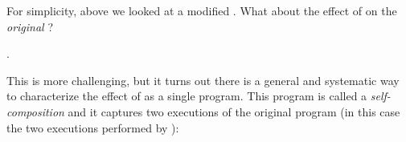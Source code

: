 \documentclass[12pt]{report}
\begin{document}
For simplicity, above we looked at a modified .
    What about the effect of  on the \textit{original} ? 
\begin{coqdoccode}
\coqdocnoindent
{} .\coqdoceol
\coqdocemptyline
\end{coqdoccode}
This is more challenging, but it turns out there is a general and
    systematic way to characterize the effect of  as a single
    program. This program is called a \textit{self-composition} and it
    captures two executions of the original program (in this case the
    two executions performed by ): 
\end{document}
